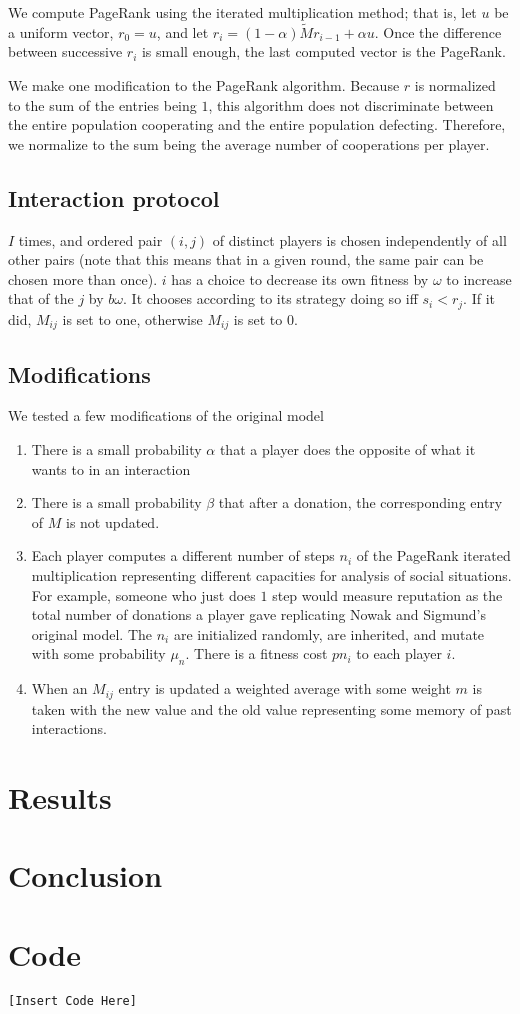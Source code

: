 \documentclass{amsart}
\begin{document}
We compute PageRank using the iterated multiplication method; that is, let $u$ be a uniform vector, $r_0 = u$, and let $r_i = (1-\alpha)\tilde M r_{i-1} + \alpha u$. Once the difference between successive $r_i$ is small enough, the last computed vector is the PageRank.

We make one modification to the PageRank algorithm. Because $r$ is normalized to the sum of the entries being $1$, this algorithm does not discriminate between the entire population cooperating and the entire population defecting. Therefore, we normalize to the sum being the average number of cooperations per player.

\subsection{Interaction protocol}
$I$ times, and ordered pair $(i,j)$ of distinct players is chosen independently of all other pairs (note that this means that in a given round, the same pair can be chosen more than once). $i$ has a choice to decrease its own fitness by $\omega$ to increase that of the $j$ by $b \omega$. It chooses according to its strategy doing so iff $s_i < r_j$. If it did, $M_{ij}$ is set to one, otherwise $M_{ij}$ is set to $0$. 

\subsection{Modifications}
We tested a few modifications of the original model
\begin{enumerate}
\item
There is a small probability $\alpha$ that a player does the opposite of what it wants to in an interaction
\item
There is a small probability $\beta$ that after a donation, the corresponding entry of $M$ is not updated.
\item
Each player computes a different number of steps $n_i$ of the PageRank iterated multiplication representing different capacities for analysis of social situations. For example, someone who just does $1$ step would measure reputation as the total number of donations a player gave replicating Nowak and Sigmund's original model. The $n_i$ are initialized randomly, are inherited, and mutate with some probability $\mu_n$. There is a fitness cost $p n_i$ to each player $i$.
\item
When an $M_{ij}$ entry is updated a weighted average with some weight $m$ is taken with the new value and the old value representing some memory of past interactions.
\end{enumerate}

\section{Results}

\section{Conclusion}

\section{Code}
\begin{verbatim}
[Insert Code Here]
\end{verbatim}




\end{document}
